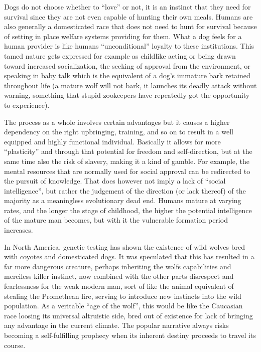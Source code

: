 \begin{footnotesize}
\begin{sffamily}
Dogs do not choose whether to “love” or not, it is an instinct that they need for survival since they are not even capable of hunting their own meals. Humans are also generally a domesticated race that does not need to hunt for survival because of setting in place welfare systems providing for them. What a dog feels for a human provider is like humans “unconditional” loyalty to these institutions. This tamed nature gets expressed for example as childlike acting or being drawn toward increased socialization, the seeking of approval from the environment, or speaking in baby talk which is the equivalent of a dog's immature bark retained throughout life (a mature wolf will not bark, it launches its deadly attack without warning, something that stupid zookeepers have repeatedly got the opportunity to experience).

The process as a whole involves certain advantages but it causes a higher dependency on the right upbringing, training, and so on to result in a well equipped and highly functional individual. Basically it allows for more “plasticity” and through that potential for freedom and self-direction, but at the same time also the risk of slavery, making it a kind of gamble. For example, the mental resources that are normally used for social approval can be redirected to the pursuit of knowledge. That does however not imply a lack of “social intelligence”, but rather the judgement of the direction (or lack thereof) of the majority as a meaningless evolutionary dead end. Humans mature at varying rates, and the longer the stage of childhood, the higher the potential intelligence of the mature man becomes, but with it the vulnerable formation period increases.

In North America, genetic testing has shown the existence of wild wolves bred with coyotes and domesticated dogs. It was speculated that this has resulted in a far more dangerous creature, perhaps inheriting the wolfs capabilities and merciless killer instinct, now combined with the other parts disrespect and fearlessness for the weak modern man, sort of like the animal equivalent of stealing the Promethean fire, serving to introduce new instincts into the wild population. As a veritable “age of the wolf”, this would be like the Caucasian race loosing its universal altruistic side, bred out of existence for lack of bringing any advantage in the current climate. The popular narrative always risks becoming a self-fulfilling prophecy when its inherent destiny proceeds to travel its course.


\end{sffamily}
\end{footnotesize}

